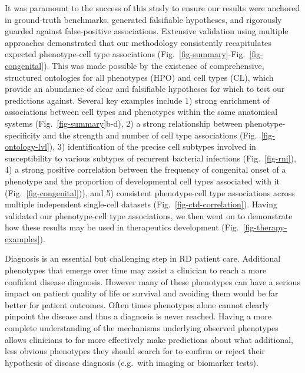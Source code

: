 \documentclass[
]{agujournal2019}
\begin{document}
It was paramount to the success of this study to ensure our results were
anchored in ground-truth benchmarks, generated falsifiable hypotheses,
and rigorously guarded against false-positive associations. Extensive
validation using multiple approaches demonstrated that our methodology
consistently recapitulates expected phenotype-cell type associations
(Fig.~\ref{fig-summary}-Fig.~\ref{fig-congenital}). This was made
possible by the existence of comprehensive, structured ontologies for
all phenotypes (HPO) and cell types (CL), which provide an abundance of
clear and falsifiable hypotheses for which to test our predictions
against. Several key examples include 1) strong enrichment of
associations between cell types and phenotypes within the same
anatomical systems (Fig.~\ref{fig-summary}b-d), 2) a strong relationship
between phenotype-specificity and the strength and number of cell type
associations (Fig.~\ref{fig-ontology-lvl}), 3) identification of the
precise cell subtypes involved in susceptibility to various subtypes of
recurrent bacterial infections (Fig.~\ref{fig-rni}), 4) a strong
positive correlation between the frequency of congenital onset of a
phenotype and the proportion of developmental cell types associated with
it (Fig.~\ref{fig-congenital})), and 5) consistent phenotype-cell type
associations across multiple independent single-cell datasets
(Fig.~\ref{fig-ctd-correlation}). Having validated our phenotype-cell
type associations, we then went on to demonstrate how these results may
be used in therapeutics development (Fig.~\ref{fig-therapy-examples}).

Diagnosis is an essential but challenging step in RD patient care.
Additional phenotypes that emerge over time may assist a clinician to
reach a more confident disease diagnosis. However many of these
phenotypes can have a serious impact on patient quality of life or
survival and avoiding them would be far better for patient outcomes.
Often times phenotypes alone cannot clearly pinpoint the disease and
thus a diagnosis is never reached. Having a more complete understanding
of the mechanisms underlying observed phenotypes allows clinicians to
far more effectively make predictions about what additional, less
obvious phenotypes they should search for to confirm or reject their
hypothesis of disease diagnosis (e.g.~with imaging or biomarker tests).
\end{document}
